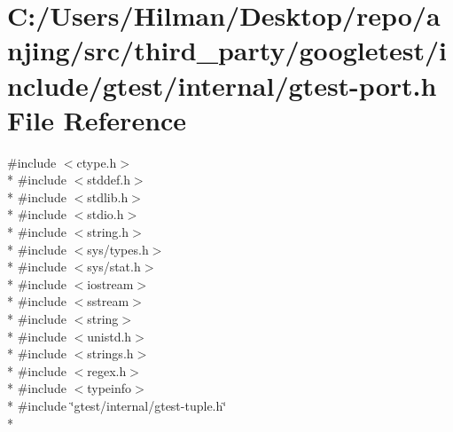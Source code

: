 \hypertarget{gtest-port_8h}{}\section{C\+:/\+Users/\+Hilman/\+Desktop/repo/anjing/src/third\+\_\+party/googletest/include/gtest/internal/gtest-\/port.h File Reference}
\label{gtest-port_8h}
{\ttfamily \#include $<$ctype.\+h$>$}\\*
{\ttfamily \#include $<$stddef.\+h$>$}\\*
{\ttfamily \#include $<$stdlib.\+h$>$}\\*
{\ttfamily \#include $<$stdio.\+h$>$}\\*
{\ttfamily \#include $<$string.\+h$>$}\\*
{\ttfamily \#include $<$sys/types.\+h$>$}\\*
{\ttfamily \#include $<$sys/stat.\+h$>$}\\*
{\ttfamily \#include $<$iostream$>$}\\*
{\ttfamily \#include $<$sstream$>$}\\*
{\ttfamily \#include $<$string$>$}\\*
{\ttfamily \#include $<$unistd.\+h$>$}\\*
{\ttfamily \#include $<$strings.\+h$>$}\\*
{\ttfamily \#include $<$regex.\+h$>$}\\*
{\ttfamily \#include $<$typeinfo$>$}\\*
{\ttfamily \#include \char`\"{}gtest/internal/gtest-\/tuple.\+h\char`\"{}}\\*
